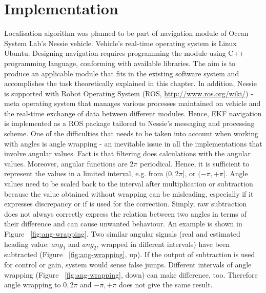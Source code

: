 \section{Implementation} \label{sec:implementation}
Localisation algorithm was planned to be part of navigation module of Ocean System Lab's Nessie vehicle. Vehicle's real-time operating system is Linux Ubuntu. Designing navigation requires programming the module using C++ programming language, conforming with available libraries. The aim is to produce an applicable module that fits in the existing software system and accomplishes the task theoretically explained in this chapter. In addition, Nessie is supported with Robot Operating System (ROS, \url{http://www.ros.org/wiki/}) - meta operating system that manages various processes maintained on vehicle and the real-time exchange of data between different modules. Hence, EKF navigation is implemented as a ROS package tailored to Nessie's messaging and processing scheme. One of the difficulties that needs to be taken into account when working with angles is angle wrapping - an inevitable issue in all the implementations that involve angular values. Fact is that filtering does calculations with the angular values. Moreover, angular functions are $2\pi$ periodical. Hence, it is sufficient to represent the values in a limited interval, e.g. from $(0,2\pi]$, or $(-\pi,+\pi]$. Angle values need to be scaled back to the interval after multiplication or subtraction because the value obtained without wrapping can be misleading, especially if it expresses discrepancy or if is used for the correction. Simply, raw subtraction does not always correctly express the relation between two angles in terms of their difference and can cause unwanted behaviour. An example is shown in Figure ~\ref{fig:ang-wrapping}. Two similar angular signals (real and estimated heading value: $ang_{1}$ and $ang_{2}$, wrapped in different intervals) have been subtracted (Figure ~\ref{fig:ang-wrapping}, up). If the output of subtraction is used for control or gain, system would sense false jumps. Different intervals of angle wrapping (Figure ~\ref{fig:ang-wrapping}, down) can make difference, too. Therefore angle wrapping to $0,2\pi$ and $-\pi,+\pi$ does not give the same result. 

